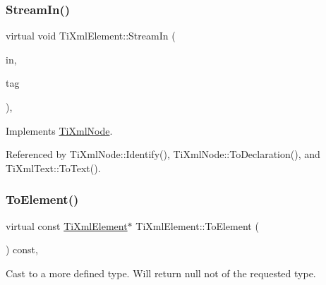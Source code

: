 \hypertarget{class_ti_xml_element_acc42052299e0bcf04871f3c2d229fe93}{}\label{class_ti_xml_element_acc42052299e0bcf04871f3c2d229fe93} 
\subsubsection{\texorpdfstring{Stream\+In()}{StreamIn()}}
{\footnotesize\ttfamily virtual void Ti\+Xml\+Element\+::\+Stream\+In (\begin{DoxyParamCaption}\item[{std\+::istream $\ast$}]{in,  }\item[{\hyperlink{tinyxml_8h_a92bada05fd84d9a0c9a5bbe53de26887}{T\+I\+X\+M\+L\+\_\+\+S\+T\+R\+I\+NG} $\ast$}]{tag }\end{DoxyParamCaption})\hspace{0.3cm}{\ttfamily [protected]}, {\ttfamily [virtual]}}



Implements \hyperlink{class_ti_xml_node_ab4b4af1a6b486dcbc0e327cf291270af}{Ti\+Xml\+Node}.



Referenced by Ti\+Xml\+Node\+::\+Identify(), Ti\+Xml\+Node\+::\+To\+Declaration(), and Ti\+Xml\+Text\+::\+To\+Text().

\hypertarget{class_ti_xml_element_a940fc8aa953e0ef0de6e110b7d98b8ee}{}\label{class_ti_xml_element_a940fc8aa953e0ef0de6e110b7d98b8ee} 
\subsubsection{\texorpdfstring{To\+Element()}{ToElement()}\hspace{0.1cm}{\footnotesize\ttfamily [1/2]}}
{\footnotesize\ttfamily virtual const \hyperlink{class_ti_xml_element}{Ti\+Xml\+Element}$\ast$ Ti\+Xml\+Element\+::\+To\+Element (\begin{DoxyParamCaption}{ }\end{DoxyParamCaption}) const\hspace{0.3cm}{\ttfamily [inline]}, {\ttfamily [virtual]}}



Cast to a more defined type. Will return null not of the requested type. 




